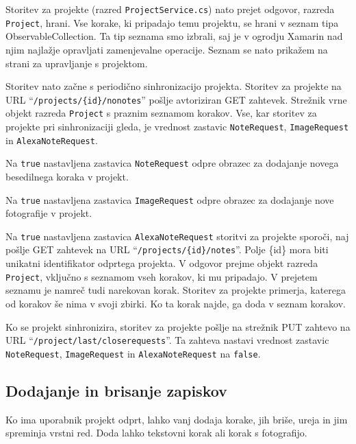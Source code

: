 \documentclass[a4paper, 12pt]{book}
\begin{document}
Storitev za projekte (razred \texttt{ProjectService.cs}) nato prejet odgovor, razreda \texttt{Project}, hrani.
Vse korake, ki pripadajo temu projektu, se hrani v seznam tipa ObservableCollection.
Ta tip seznama smo izbrali, saj je v ogrodju Xamarin nad njim najlažje opravljati zamenjevalne operacije.
Seznam se nato prikažem na strani za upravljanje s projektom.

Storitev nato začne s periodično sinhronizacijo projekta.
Storitev za projekte na URL \enquote{\texttt{/projects/\{id\}/nonotes}} pošlje avtoriziran GET zahtevek.
Strežnik vrne objekt razreda \texttt{Project} s praznim seznamom korakov.
Vse, kar storitev za projekte pri sinhronizaciji gleda, je vrednost zastavic \texttt{NoteRequest}, \texttt{ImageRequest} in \texttt{AlexaNoteRequest}.

Na \texttt{true} nastavljena zastavica \texttt{NoteRequest} odpre obrazec za dodajanje novega besedilnega koraka v projekt.

Na \texttt{true} nastavljena zastavica \texttt{ImageRequest} odpre obrazec za dodajanje nove fotografije v projekt.

Na \texttt{true} nastavljena zastavica \texttt{AlexaNoteRequest} storitvi za projekte sporoči, naj pošlje GET zahtevek na URL \enquote{\texttt{/projects/\{id\}/notes}}.
Polje \{id\} mora biti unikatni identifikator odprtega projekta.
V odgovor prejme objekt razreda \texttt{Project}, vključno s seznamom vseh korakov, ki mu pripadajo.
V prejetem seznamu je namreč tudi narekovan korak.
Storitev za projekte primerja, katerega od korakov še nima v svoji zbirki.
Ko ta korak najde, ga doda v seznam korakov. 

Ko se projekt sinhronizira, storitev za projekte pošlje na strežnik PUT zahtevo na URL \enquote{\texttt{/project/last/closerequests}}.
Ta zahteva nastavi vrednost zastavic \texttt{NoteRequest}, \texttt{ImageRequest} in \texttt{AlexaNoteRequest} na \texttt{false}.


\subsection{Dodajanje in brisanje zapiskov}

Ko ima uporabnik projekt odprt, lahko vanj dodaja korake, jih briše, ureja in jim spreminja vrstni red.
Doda lahko tekstovni korak ali korak s fotografijo.
\end{document}

